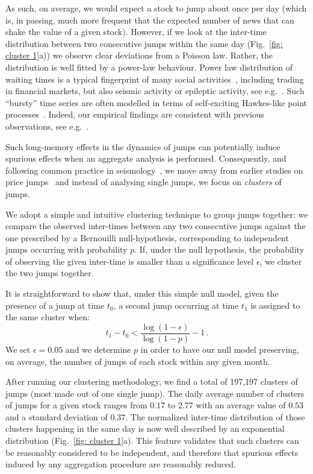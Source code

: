 \documentclass[amsmath,amssymb,aps,pre,floatfix,twocolumn,superscriptaddress]{revtex4}
\begin{document}
As such, on average, we would expect a stock to jump about once per day (which is, in passing, much more frequent that the expected number of news that can shake the value of a given stock). However, if we look at the inter-time distribution between two consecutive jumps within the same day (Fig.~\ref{fig: cluster 1}a)) we observe clear deviations from a Poisson law. Rather, the distribution is well fitted by a power-law behaviour. Power law distribution of waiting times is a typical fingerprint of many social activities~\cite{barabasi_burstiness}, including trading in financial markets, but also seismic activity or epileptic activity, see e.g.~\cite{saichev,chicheportiche}. Such ``bursty'' time series are often modelled in terms of self-exciting Hawkes-like point processes~\cite{hawkes_mastromatteo}. Indeed, our empirical findings are consistent with previous observations, see e.g.~\cite{lillo_cojump}. 

Such long-memory effects in the dynamics of jumps can potentially induce spurious effects when an aggregate analysis is performed. Consequently, and following common practice in seismology~\cite{sornette_ETAS}, we move away from earlier studies on price jumps~\cite{boudt2014intraday,vol_news_jp} and instead of analysing single jumps, we focus on {\it clusters} of jumps. 

We adopt a simple and intuitive clustering technique to group jumps together: we compare the observed inter-times between any two consecutive jumps against the one prescribed by a Bernouilli null-hypothesis, corresponding to independent jumps occurring with probability $p$. If, under the null hypothesis, the probability of observing the given inter-time is smaller than a significance level $\epsilon$, we cluster the two jumps together. 

It is straightforward to show that, under this simple null model, given the presence of a jump at time $t_0$, a second jump occurring at time $t_1$ is assigned to the same cluster when:
\begin{equation}\label{eq: cluster limit}
t_1-t_0 <  \frac{\log \left( 1-\epsilon \right)}{\log \left( 1-p \right)} - 1 \, .
\end{equation}
We set $\epsilon=0.05$ and we determine $p$ in order to have our null model preserving, on average, the number of jumps of each stock within any given month.

After running our clustering methodology, we find a total of 197,197 clusters of jumps (most made out of one single jump). The daily average number of clusters of jumps for a given stock ranges from $0.17$ to $2.77$ with an average value of $0.53$ and a standard deviation of $0.37$. The normalized inter-time distribution of those clusters happening in the same day is now well described by an exponential distribution (Fig.~\ref{fig: cluster 1}a). This feature validates that such clusters can be reasonably considered to be independent, and therefore that spurious effects induced by any aggregation procedure are reasonably reduced.
\end{document}
